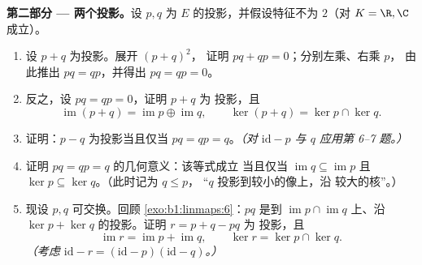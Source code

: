 \begin{problem}
\medskip
\noindent\textbf{第二部分 --- 两个投影。}设 $p, q$ 为
$E$ 的投影，并假设特征不为 $2$（对
$K = \R, \C$ 成立）。
\begin{enumerate}[resume]
  \item 设 $p + q$ 为投影。展开 $(p + q)^2$，
        证明 $pq + qp = 0$；分别左乘、右乘 $p$，
        由此推出 $pq = qp$，并得出 $pq = qp =
        0$。
  \item 反之，设 $pq = qp = 0$，证明 $p + q$ 为
        投影，且
        \[
        \operatorname{im}(p + q) = \operatorname{im} p \oplus
        \operatorname{im} q,
        \qquad
        \ker(p + q) = \ker p \cap \ker q .
        \]
  \item 证明：$p - q$ 为投影当且仅当 $pq = qp
        = q$。\emph{（对 $\mathrm{id} - p$
        与 $q$ 应用第 6--7 题。）}
  \item 证明 $pq = qp = q$ 的几何意义：该等式成立
        当且仅当 $\operatorname{im} q \subseteq
        \operatorname{im} p$ 且 $\ker p \subseteq \ker q$。（此时记为 $q \leq p$，
        “$q$ 投影到较小的像上，沿
        较大的核”。）
  \item 现设 $p, q$ 可交换。回顾
        \cref{exo:b1:linmaps:6}：$pq$ 是到
        $\operatorname{im} p \cap \operatorname{im} q$ 上、沿
        $\ker p + \ker q$ 的投影。证明 $r = p + q - pq$ 为
        投影，且
        \[
        \operatorname{im} r = \operatorname{im} p +
        \operatorname{im} q,
        \qquad
        \ker r = \ker p \cap \ker q .
        \]
        \emph{（考虑 $\mathrm{id} - r = (\mathrm{id} -
        p)(\mathrm{id} - q)$。）}
\end{enumerate}


\end{problem}

